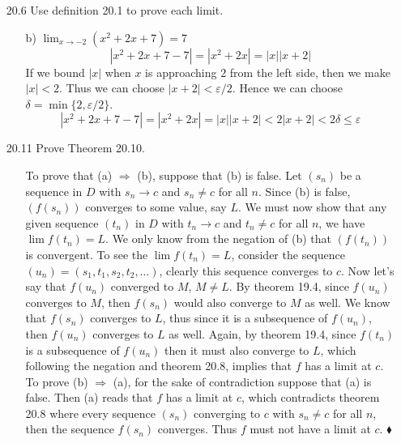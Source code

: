 \documentclass[12pt]{article}
\begin{document}
\begin{enumerate}
\begin{enumerate}
\item[20.6] Use definition 20.1 to prove each limit.
\begin{enumerate}
\item[b)] $\lim_{x \rightarrow -2}(x^2 + 2x + 7) = 7$
\[
|x^2 + 2x + 7 - 7 | = |x^2 + 2x| = |x||x + 2|
\]
If we bound $|x|$ when $x$ is approaching $2$ from the left side, then we make
$|x| < 2$. Thus we can choose $|x + 2| < \varepsilon /2$. Hence we can choose 
$\delta = \min\{2, \varepsilon /2 \}$.
\[
|x^2 + 2x + 7 - 7 | = |x^2 + 2x| = |x||x + 2| < 2|x + 2| < 2\delta \leq \varepsilon
\]
\end{enumerate}

\item[20.11] Prove Theorem 20.10.
\begin{enumerate}
\item[] To prove that (a) $\Rightarrow$ (b), suppose that (b) is false. Let $(s_n)$ be a sequence
in $D$ with $s_n \rightarrow c$ and $s_n \neq c$ for all $n$. Since (b) is false, $(f(s_n))$ 
converges to some value, say $L$. We must now show that any given sequence $(t_n)$ in $D$ with
$t_n \rightarrow c$ and $t_n \neq c$ for all $n$, we have $\lim f(t_n) = L$. We only know from the
negation of (b) that $(f(t_n))$ is convergent. To see the $\lim f(t_n) = L$, consider the sequence
$(u_n) = (s_1, t_1, s_2, t_2, \ldots )$, clearly this sequence converges to $c$. Now let's say
that $f(u_n)$ converged to $M$, $M \neq L$. By theorem 19.4, since $f(u_n)$ converges to 
$M$, then $f(s_n)$ would also converge to $M$ as well. We know that $f(s_n)$ converges to $L$, thus
since it is a subsequence of $f(u_n)$, then $f(u_n)$ converges to $L$ as well. Again, by 
theorem 19.4, since $f(t_n)$ is a subsequence of $f(u_n)$ then it must also converge to $L$,
which following the negation and theorem 20.8, implies that $f$ has a limit at $c$. To prove
(b) $\Rightarrow$ (a), for the sake of contradiction suppose that (a) is false. Then (a) reads
that $f$ has a limit at $c$, which contradicts theorem 20.8 where every sequence $(s_n)$ converging
to $c$ with $s_n \neq c$ for all $n$, then the sequence $f(s_n)$ converges. Thus $f$ must not
have a limit at $c$. $\blacklozenge$
\end{enumerate}


\end{enumerate}
\end{enumerate}
\end{document}
